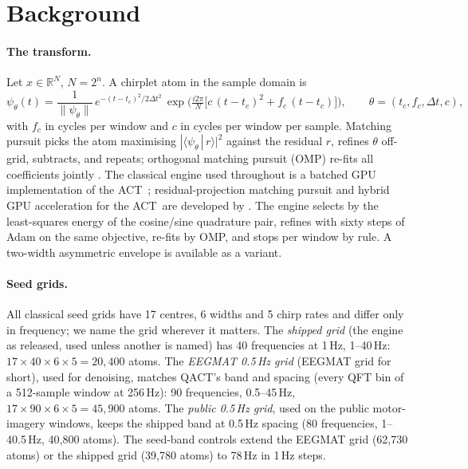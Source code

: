 \documentclass{article}
\newcommand{\qact}{QACT}
\newcommand{\act}{ACT}
\newcommand{\braket}[2]{\langle #1\,|\,#2\rangle}
\newcommand{\norm}[1]{\lVert #1\rVert}
\begin{document}
\section{Background}
\label{sec:background}
\paragraph{The transform.} Let $x\in\mathbb{R}^N$, $N=2^n$. A chirplet atom in the sample domain is
\begin{equation}
\psi_\theta(t)=\frac{1}{\norm{\psi_\theta}}\,e^{-(t-t_c)^2/2\Delta t^2}\,\exp\!\Big(\tfrac{i2\pi}{N}\big[c\,(t-t_c)^2+f_c\,(t-t_c)\big]\Big),\qquad \theta=(t_c,f_c,\Delta t,c),
\label{eq:atom}
\end{equation}
with $f_c$ in cycles per window and $c$ in cycles per window per sample. Matching pursuit picks the atom maximising $|\braket{\psi_\theta}{r}|^2$ against the residual $r$, refines $\theta$ off-grid, subtracts, and repeats; orthogonal matching pursuit (OMP) re-fits all coefficients jointly \citep{pati1993omp}. The classical engine used throughout is a batched GPU implementation of the \act\ \citep{actcode}; residual-projection matching pursuit and hybrid GPU acceleration for the \act\ are developed by \citet{kumar2026stable}. The engine selects by the least-squares energy of the cosine/sine quadrature pair, refines with sixty steps of Adam on the same objective, re-fits by OMP, and stops per window by rule. A two-width asymmetric envelope \citep{actcode} is available as a variant.

\paragraph{Seed grids.} All classical seed grids have 17 centres, 6 widths and 5 chirp rates and differ only in frequency; we name the grid wherever it matters. The \emph{shipped grid} (the engine as released, used unless another is named) has 40 frequencies at 1\,Hz, 1--40\,Hz: $17\times40\times6\times5=20{,}400$ atoms. The \emph{EEGMAT 0.5\,Hz grid} (EEGMAT grid for short), used for denoising, matches \qact's band and spacing (every QFT bin of a 512-sample window at 256\,Hz): 90 frequencies, 0.5--45\,Hz, $17\times90\times6\times5=45{,}900$ atoms. The \emph{public 0.5\,Hz grid}, used on the public motor-imagery windows, keeps the shipped band at 0.5\,Hz spacing (80 frequencies, 1--40.5\,Hz, 40,800 atoms). The seed-band controls extend the EEGMAT grid (62,730 atoms) or the shipped grid (39,780 atoms) to 78\,Hz in 1\,Hz steps.
\end{document}
